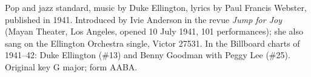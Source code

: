 \begin{notes}[History]
Pop and jazz standard, music by Duke Ellington, lyrics by Paul Francis Webster,
published in 1941. Introduced by Ivie Anderson in the revue \emph{Jump for Joy}
(Mayan Theater, Los Angeles, opened 10 July 1941, 101 performances); she also sang
on the Ellington Orchestra single, Victor 27531. In the Billboard charts of 1941--42:
Duke Ellington (\#13) and Benny Goodman with Peggy Lee (\#25).
Original key G major; form AABA.
\end{notes}

